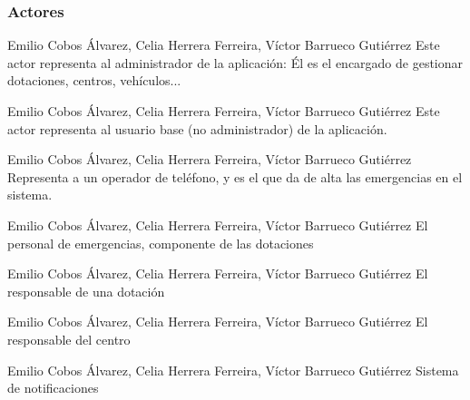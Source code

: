 \subsubsection{Actores}

{Emilio Cobos Álvarez, Celia Herrera Ferreira, Víctor Barrueco Gutiérrez}
{}
{Este actor representa al administrador de la aplicación: Él es el encargado de gestionar dotaciones, centros, vehículos...}

{Emilio Cobos Álvarez, Celia Herrera Ferreira, Víctor Barrueco Gutiérrez}
{}
{Este actor representa al usuario base (no administrador) de la aplicación.}

{Emilio Cobos Álvarez, Celia Herrera Ferreira, Víctor Barrueco Gutiérrez}
{}
{Representa a un operador de teléfono, y es el que da de alta las emergencias en el sistema.}

{Emilio Cobos Álvarez, Celia Herrera Ferreira, Víctor Barrueco Gutiérrez}
{}
{El personal de emergencias, componente de las dotaciones}

{Emilio Cobos Álvarez, Celia Herrera Ferreira, Víctor Barrueco Gutiérrez}
{}
{El responsable de una dotación}

{Emilio Cobos Álvarez, Celia Herrera Ferreira, Víctor Barrueco Gutiérrez}
{}
{El responsable del centro}

{Emilio Cobos Álvarez, Celia Herrera Ferreira, Víctor Barrueco Gutiérrez}
{}
{Sistema de notificaciones}

